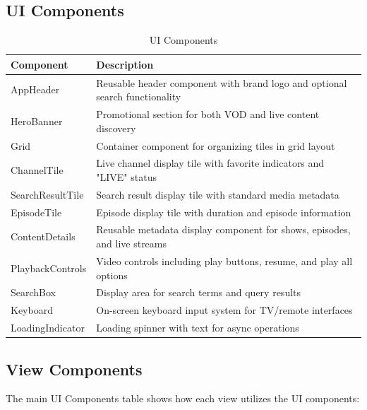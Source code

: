 \documentclass[11pt,letterpaper]{article}
\begin{document}
\subsection{UI Components}
\begin{table}[H]
\centering
\scriptsize
\begin{tabular}{@{}p{}p{}@{}}
\toprule
\textbf{Component} & \textbf{Description} \\
\midrule
AppHeader & Reusable header component with brand logo and optional search functionality \\
HeroBanner & Promotional section for both VOD and live content discovery \\
Grid & Container component for organizing tiles in grid layout \\
ChannelTile & Live channel display tile with favorite indicators and "LIVE" status \\
SearchResultTile & Search result display tile with standard media metadata \\
EpisodeTile & Episode display tile with duration and episode information \\
ContentDetails & Reusable metadata display component for shows, episodes, and live streams \\
PlaybackControls & Video controls including play buttons, resume, and play all options \\
SearchBox & Display area for search terms and query results \\
Keyboard & On-screen keyboard input system for TV/remote interfaces \\
LoadingIndicator & Loading spinner with text for async operations \\
\bottomrule
\end{tabular}
\caption{\small UI Components}
\label{tab:ui-components-list}
\end{table}

\subsection{View Components}
The main UI Components table shows how each view utilizes the UI components:
\end{document}
